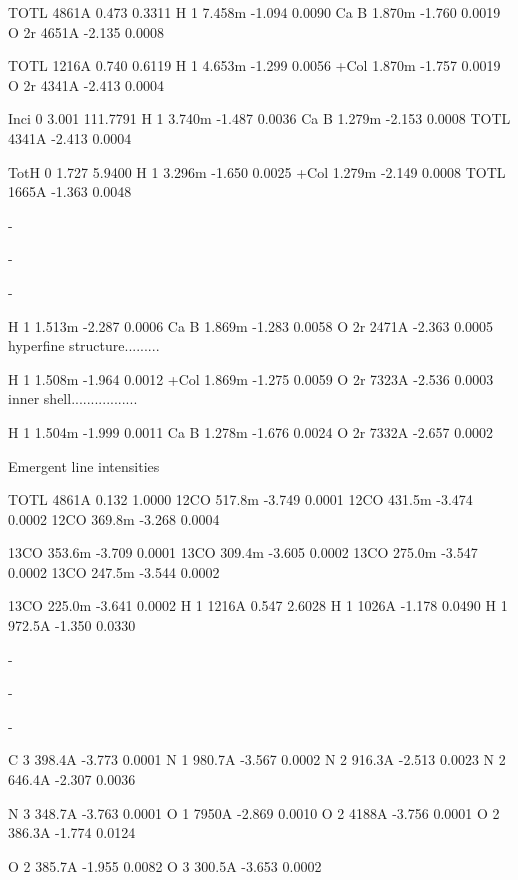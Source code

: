 { TOTL  4861A   0.473   0.3311      H  1 7.458m  -1.094   0.0090      Ca
B 1.870m  -1.760   0.0019      O 2r  4651A  -2.135   0.0008            

 TOTL  1216A   0.740   0.6119      H  1 4.653m  -1.299   0.0056      +Col
1.870m  -1.757   0.0019      O 2r  4341A  -2.413   0.0004            

 Inci     0    3.001 111.7791      H  1 3.740m  -1.487   0.0036      Ca
B 1.279m  -2.153   0.0008      TOTL  4341A  -2.413   0.0004            

 TotH     0    1.727   5.9400      H  1 3.296m  -1.650   0.0025      +Col
1.279m  -2.149   0.0008      TOTL  1665A  -1.363   0.0048            

-

 -

 -

 H  1 1.513m  -2.287   0.0006      Ca B 1.869m  -1.283   0.0058      O 2r
2471A  -2.363   0.0005      hyperfine structure.........            

 H  1 1.508m  -1.964   0.0012      +Col 1.869m  -1.275   0.0059      O 2r
7323A  -2.536   0.0003      inner shell.................            

 H  1 1.504m  -1.999   0.0011      Ca B 1.278m  -1.676   0.0024      O 2r
7332A  -2.657   0.0002            

                                                   Emergent line intensities

 TOTL  4861A   0.132   1.0000      12CO 517.8m  -3.749   0.0001      12CO
431.5m  -3.474   0.0002      12CO 369.8m  -3.268   0.0004      

 13CO 353.6m  -3.709   0.0001      13CO 309.4m  -3.605   0.0002      13CO
275.0m  -3.547   0.0002      13CO 247.5m  -3.544   0.0002      

 13CO 225.0m  -3.641   0.0002      H  1  1216A   0.547   2.6028        
H  1  1026A  -1.178   0.0490      H  1 972.5A  -1.350   0.0330      

-

-

-

 C  3 398.4A  -3.773   0.0001      N  1 980.7A  -3.567   0.0002      N 
2 916.3A  -2.513   0.0023      N  2 646.4A  -2.307   0.0036      

 N  3 348.7A  -3.763   0.0001      O  1  7950A  -2.869   0.0010      O 
2  4188A  -3.756   0.0001      O  2 386.3A  -1.774   0.0124      

 O  2 385.7A  -1.955   0.0082      O  3 300.5A  -3.653   0.0002      

}
